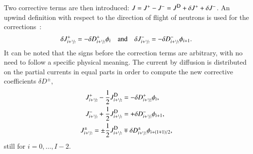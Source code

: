 Two corrective terms are then introduced: $J = \jp - \jm = \jD + \delta J^+ + \delta J^-$. An upwind definition with respect to the direction of flight of neutrons is used for the corrections~\cite{Jarrett-2016,Zhu-2016}:
\begin{equation}
  \label{eq:CCF-sub}
  \delta J^+ _{i+\sfrac{1}{2}} = -\delta D^+ _{i+\sfrac{1}{2}} \phi_i
  \quad \text{and} \quad
  \delta J^- _{i+\sfrac{1}{2}} = -\delta D^- _{i+\sfrac{1}{2}} \phi_{i+1}.
\end{equation}
It can be noted that the signs before the correction terms are arbitrary, with no need to follow a specific physical meaning. 
%
%
The current by diffusion is distributed on the partial currents in equal parts in order to compute the new corrective coefficients $\delta D^{\pm}$,
\begin{subequations}
  \label{eq:delta-D-pCMFD}
  \begin{align}
    J^+_{i+\hzi} - \frac{1}{2}\jD_{i+\hzi} &= -\delta D^+_{i+\hzi} \phi_i, \label{eq:delta-D-pCMFDp}\\
    J^-_{i+\hzi} + \frac{1}{2}\jD_{i+\hzi} &= +\delta D^-_{i+\hzi} \phi_{i+1}, \label{eq:delta-D-pCMFDm}\\
    J^\pm_{i+\hzi} = \pm \frac{1}{2}\jD_{i+\hzi}& \mp \delta D^{\pm} _{i+\hzi} \phi_{i+(1\mp 1)/2}\label{eq:delta-D-pCMFDpm},
  \end{align}
\end{subequations}
still for $i=0, \ldots, I-2$.
%
%
